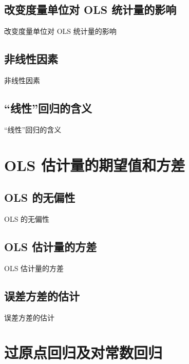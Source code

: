 \documentclass[UTF8]{ctexbeamer}
\begin{document}
\subsection{改变度量单位对 OLS 统计量的影响}
\begin{frame}{改变度量单位对 OLS 统计量的影响}
\end{frame}


\subsection{非线性因素}
\begin{frame}{非线性因素}
\end{frame}


\subsection{“线性”回归的含义}
\begin{frame}{“线性”回归的含义}
\end{frame}

\section{OLS 估计量的期望值和方差}
\subsection{OLS 的无偏性}
\begin{frame}{OLS 的无偏性}
\end{frame}


\subsection{OLS 估计量的方差}
\begin{frame}{OLS 估计量的方差}
\end{frame}


\subsection{误差方差的估计}
\begin{frame}{误差方差的估计}
\end{frame}

\section{过原点回归及对常数回归}
\end{document}
